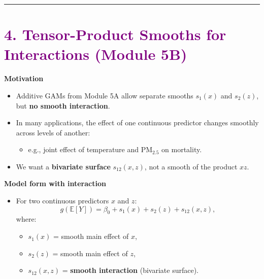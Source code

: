 \documentclass[
  letterpaper,
  DIV=11,
  numbers=noendperiod]{scrreprt}
\providecommand{\tightlist}{%
  \setlength{\itemsep}{0pt}\setlength{\parskip}{0pt}}\usepackage{longtable,booktabs,array}
\begin{document}
\begin{center}\rule{0.5\linewidth}{0.5pt}\end{center}

\hypertarget{section-46}{%
\section*{\texorpdfstring{\textcolor{purple}{4. Tensor-Product Smooths for Interactions (Module 5B)}}{}}\label{section-46}}

\markright{\textcolor{purple}{4. Tensor-Product Smooths for Interactions (Module 5B)}}

\textbf{Motivation}

\begin{itemize}
\tightlist
\item
  Additive GAMs from Module 5A allow separate smooths \(s_1(x)\) and
  \(s_2(z)\), but \textbf{no smooth interaction}.
\item
  In many applications, the effect of one continuous predictor changes
  smoothly across levels of another:

  \begin{itemize}
  \tightlist
  \item
    e.g., joint effect of temperature and PM\(_{2.5}\) on mortality.
  \end{itemize}
\item
  We want a \textbf{bivariate surface} \(s_{12}(x,z)\), not a smooth of
  the product \(xz\).
\end{itemize}

\textbf{Model form with interaction}

\begin{itemize}
\tightlist
\item
  For two continuous predictors \(x\) and \(z\): \[
  g(\mathbb{E}[Y]) = \beta_0 + s_1(x) + s_2(z) + s_{12}(x,z),
  \] where:

  \begin{itemize}
  \tightlist
  \item
    \(s_1(x)\) = smooth main effect of \(x\),
  \item
    \(s_2(z)\) = smooth main effect of \(z\),
  \item
    \(s_{12}(x,z)\) = \textbf{smooth interaction} (bivariate surface).
  \end{itemize}
\end{itemize}
\end{document}
